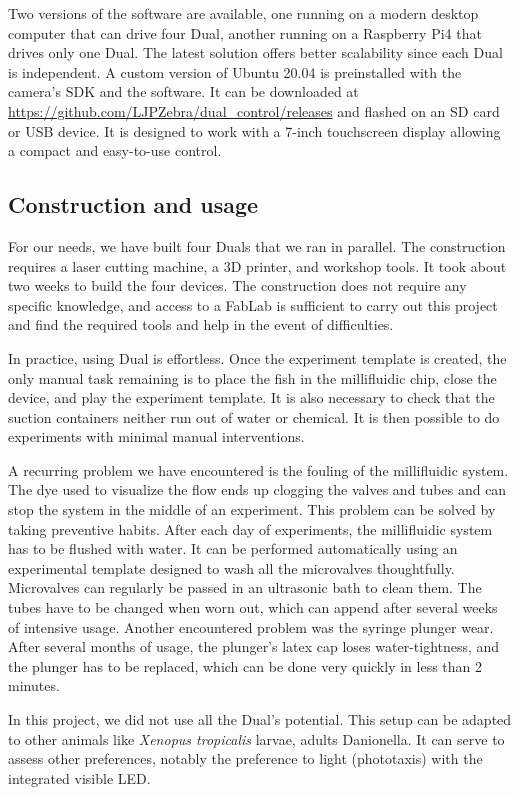   Two versions of the software are available, one running on a modern desktop computer that can drive four Dual, another running on a Raspberry Pi4 that drives only one Dual. The latest solution offers better scalability since each Dual is independent. A custom version of Ubuntu 20.04 is preinstalled with the camera's SDK and the software. It can be downloaded at \url{https://github.com/LJPZebra/dual_control/releases} and flashed on an SD card or USB device. It is designed to work with a 7-inch touchscreen display allowing a compact and easy-to-use control.

  \subsection{Construction and usage}
  For our needs, we have built four Duals that we ran in parallel. The construction requires a laser cutting machine, a 3D printer, and workshop tools. It took about two weeks to build the four devices. The construction does not require any specific knowledge, and access to a FabLab is sufficient to carry out this project and find the required tools and help in the event of difficulties.

  In practice, using Dual is effortless. Once the experiment template is created, the only manual task remaining is to place the fish in the millifluidic chip, close the device, and play the experiment template. It is also necessary to check that the suction containers neither run out of water or chemical. It is then possible to do experiments with minimal manual interventions.

  A recurring problem we have encountered is the fouling of the millifluidic system. The dye used to visualize the flow ends up clogging the valves and tubes and can stop the system in the middle of an experiment. This problem can be solved by taking preventive habits. After each day of experiments, the millifluidic system has to be flushed with water. It can be performed automatically using an experimental template designed to wash all the microvalves thoughtfully. Microvalves can regularly be passed in an ultrasonic bath to clean them. The tubes have to be changed when worn out, which can append after several weeks of intensive usage. Another encountered problem was the syringe plunger wear. After several months of usage, the plunger's latex cap loses water-tightness, and the plunger has to be replaced, which can be done very quickly in less than 2 minutes.

  In this project, we did not use all the Dual's potential. This setup can be adapted to other animals like \textit{Xenopus tropicalis} larvae, adults Danionella. It can serve to assess other preferences, notably the preference to light (phototaxis) with the integrated visible LED.

